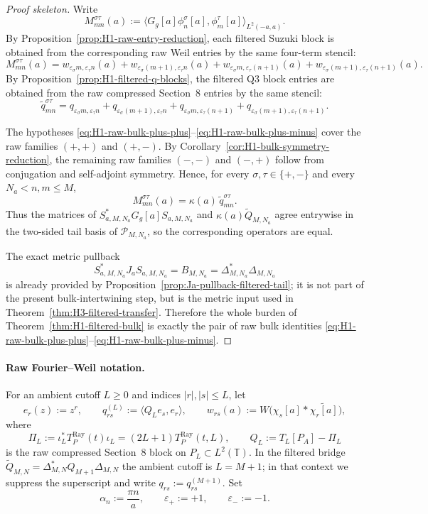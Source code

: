\begin{proof}[Proof skeleton]
Write
\[
  M_{mn}^{\sigma\tau}(a)
  :=
  \bigl\langle G_g[a]\phi_n^\sigma[a],\phi_m^\tau[a]\bigr\rangle_{L^2(-a,a)}.
\]
By Proposition~\ref{prop:H1-raw-entry-reduction}, each filtered Suzuki block is
obtained from the corresponding raw Weil entries by the same four-term stencil:
\[
  M_{mn}^{\sigma\tau}(a)
  =
  w_{\varepsilon_\sigma m,\varepsilon_\tau n}(a)
  +w_{\varepsilon_\sigma(m+1),\varepsilon_\tau n}(a)
  +w_{\varepsilon_\sigma m,\varepsilon_\tau(n+1)}(a)
  +w_{\varepsilon_\sigma(m+1),\varepsilon_\tau(n+1)}(a).
\]
By Proposition~\ref{prop:H1-filtered-q-blocks}, the filtered Q3 block entries are
obtained from the raw compressed Section~8 entries by the same stencil:
\[
  \widetilde q_{mn}^{\sigma\tau}
  =
  q_{\varepsilon_\sigma m,\varepsilon_\tau n}
  +q_{\varepsilon_\sigma(m+1),\varepsilon_\tau n}
  +q_{\varepsilon_\sigma m,\varepsilon_\tau(n+1)}
  +q_{\varepsilon_\sigma(m+1),\varepsilon_\tau(n+1)}.
\]

The hypotheses \eqref{eq:H1-raw-bulk-plus-plus}--\eqref{eq:H1-raw-bulk-plus-minus}
cover the raw families $(+,+)$ and $(+,-)$. By
Corollary~\ref{cor:H1-bulk-symmetry-reduction}, the remaining raw families
$(-,-)$ and $(-,+)$ follow from conjugation and self-adjoint symmetry. Hence,
for every $\sigma,\tau\in\{+,-\}$ and every $N_a<n,m\le M$,
\[
  M_{mn}^{\sigma\tau}(a)=\kappa(a)\,\widetilde q_{mn}^{\sigma\tau}.
\]
Thus the matrices of $S_{a,M,N_a}^*G_g[a]S_{a,M,N_a}$ and
$\kappa(a)\widetilde Q_{M,N_a}$ agree entrywise in the two-sided tail basis
of $\mathcal P_{M,N_a}$, so the corresponding operators are equal.

The exact metric pullback
\[
  S_{a,M,N_a}^*J_aS_{a,M,N_a}=B_{M,N_a}=\Delta_{M,N_a}^*\Delta_{M,N_a}
\]
is already provided by Proposition~\ref{prop:Ja-pullback-filtered-tail}; it is
not part of the present bulk-intertwining step, but is the metric input used in
Theorem~\ref{thm:H3-filtered-transfer}. Therefore the whole burden of
Theorem~\ref{thm:H1-filtered-bulk} is exactly the pair of raw bulk identities
\eqref{eq:H1-raw-bulk-plus-plus}--\eqref{eq:H1-raw-bulk-plus-minus}.
\end{proof}

\paragraph{Raw Fourier--Weil notation.}
For an ambient cutoff $L\ge 0$ and indices $|r|,|s|\le L$, let
\[
  e_r(z):=z^r,
  \qquad
  q_{rs}^{(L)}:=\bigl\langle Q_L e_s,e_r\bigr\rangle,
  \qquad
  w_{rs}(a):=W\bigl(\chi_s[a]*\widetilde{\chi_r[a]}\bigr),
\]
where
\[
  \Pi_L:=\iota_L^*T_P^{\mathrm{Ray}}(t)\iota_L=(2L+1)T_P^{\mathrm{Ray}}(t,L),
  \qquad
  Q_L:=T_L[P_A]-\Pi_L
\]
is the raw compressed Section~8 block on $P_L\subset L^2(\mathbb T)$. In the
filtered bridge $\widetilde Q_{M,N}=\Delta_{M,N}^*Q_{M+1}\Delta_{M,N}$ the
ambient cutoff is $L=M+1$; in that context we suppress the superscript and
write $q_{rs}:=q_{rs}^{(M+1)}$.
Set
\[
  \alpha_n:=\frac{\pi n}{a},
  \qquad
  \varepsilon_+:=+1,
  \qquad
  \varepsilon_-:=-1.
\]

